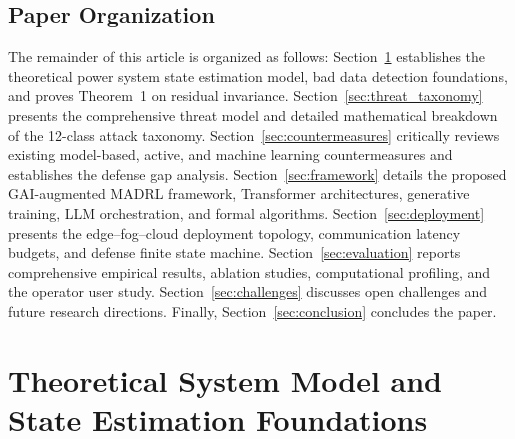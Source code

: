 \documentclass[journal,compsoc]{IEEEtran}
\begin{document}
\subsection{Paper Organization}
The remainder of this article is organized as follows: Section~\ref{sec:theory} establishes the theoretical power system state estimation model, bad data detection foundations, and proves Theorem~1 on residual invariance. Section~\ref{sec:threat_taxonomy} presents the comprehensive threat model and detailed mathematical breakdown of the 12-class attack taxonomy. Section~\ref{sec:countermeasures} critically reviews existing model-based, active, and machine learning countermeasures and establishes the defense gap analysis. Section~\ref{sec:framework} details the proposed GAI-augmented MADRL framework, Transformer architectures, generative training, LLM orchestration, and formal algorithms. Section~\ref{sec:deployment} presents the edge--fog--cloud deployment topology, communication latency budgets, and defense finite state machine. Section~\ref{sec:evaluation} reports comprehensive empirical results, ablation studies, computational profiling, and the operator user study. Section~\ref{sec:challenges} discusses open challenges and future research directions. Finally, Section~\ref{sec:conclusion} concludes the paper.


\section{Theoretical System Model and State Estimation Foundations}
\label{sec:theory}
\end{document}
